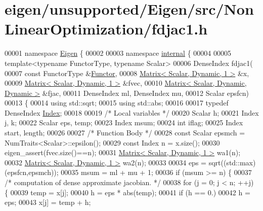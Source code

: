 \hypertarget{eigen_2unsupported_2_eigen_2src_2_non_linear_optimization_2fdjac1_8h_source}{}\section{eigen/unsupported/\+Eigen/src/\+Non\+Linear\+Optimization/fdjac1.h}
\label{eigen_2unsupported_2_eigen_2src_2_non_linear_optimization_2fdjac1_8h_source}

\begin{DoxyCode}
00001 \textcolor{keyword}{namespace }\hyperlink{namespace_eigen}{Eigen} \{ 
00002 
00003 \textcolor{keyword}{namespace }\hyperlink{namespaceinternal}{internal} \{
00004 
00005 \textcolor{keyword}{template}<\textcolor{keyword}{typename} FunctorType, \textcolor{keyword}{typename} Scalar>
00006 DenseIndex fdjac1(
00007         \textcolor{keyword}{const} FunctorType &\hyperlink{struct_functor}{Functor},
00008         \hyperlink{group___core___module}{Matrix< Scalar, Dynamic, 1 >}  &x,
00009         \hyperlink{group___core___module}{Matrix< Scalar, Dynamic, 1 >}  &fvec,
00010         \hyperlink{group___core___module}{Matrix< Scalar, Dynamic, Dynamic >} &fjac,
00011         DenseIndex ml, DenseIndex mu,
00012         Scalar epsfcn)
00013 \{
00014     \textcolor{keyword}{using} std::sqrt;
00015     \textcolor{keyword}{using} std::abs;
00016     
00017     \textcolor{keyword}{typedef} DenseIndex \hyperlink{namespace_eigen_a62e77e0933482dafde8fe197d9a2cfde}{Index};
00018 
00019     \textcolor{comment}{/* Local variables */}
00020     Scalar h;
00021     Index j, k;
00022     Scalar eps, temp;
00023     Index msum;
00024     \textcolor{keywordtype}{int} iflag;
00025     Index start, length;
00026 
00027     \textcolor{comment}{/* Function Body */}
00028     \textcolor{keyword}{const} Scalar epsmch = NumTraits<Scalar>::epsilon();
00029     \textcolor{keyword}{const} Index n = x.size();
00030     eigen\_assert(fvec.size()==n);
00031     \hyperlink{group___core___module}{Matrix< Scalar, Dynamic, 1 >}  wa1(n);
00032     \hyperlink{group___core___module}{Matrix< Scalar, Dynamic, 1 >}  wa2(n);
00033 
00034     eps = sqrt((std::max)(epsfcn,epsmch));
00035     msum = ml + mu + 1;
00036     \textcolor{keywordflow}{if} (msum >= n) \{
00037         \textcolor{comment}{/* computation of dense approximate jacobian. */}
00038         \textcolor{keywordflow}{for} (j = 0; j < n; ++j) \{
00039             temp = x[j];
00040             h = eps * abs(temp);
00041             \textcolor{keywordflow}{if} (h == 0.)
00042                 h = eps;
00043             x[j] = temp + h;

\end{DoxyCode}
